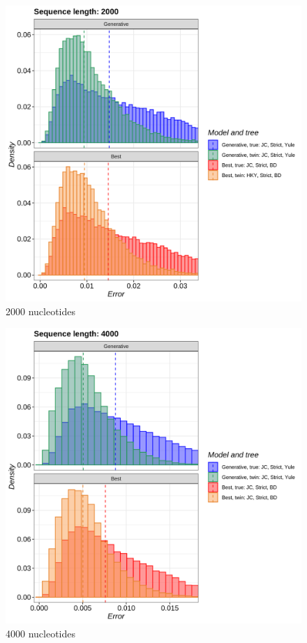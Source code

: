 \begin{figure}[H]
  \includegraphics[width=\textwidth]{pirouette_example_21/errors_2000.png}
  \caption{2000 nucleotides}
\end{figure}

\begin{figure}[H]
  \includegraphics[width=\textwidth]{pirouette_example_21/errors_4000.png}
  \caption{4000 nucleotides}
\end{figure}

